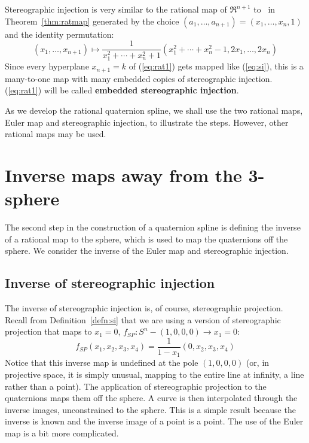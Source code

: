 \documentclass[11pt]{article}
\begin{document}
Stereographic injection is very similar to the rational map of $\Re^{n+1}$ to
\ in Theorem~\ref{thm:ratmap} generated by the choice 
$(a_1,\ldots,a_{n+1}) = (x_1,\ldots,x_{n},1)$ and the identity permutation:
%
\begin{equation}
\label{eq:rat1}
(x_1,\ldots,x_{n+1}) \mapsto 
	\frac{1}{x_1^2 + \cdots + x_{n}^2 + 1}
	(x_1^2 + \cdots + x_{n}^2 - 1,
	 2x_1, \ldots, 2x_{n})
\end{equation}
%
Since every hyperplane $x_{n+1}=k$ of (\ref{eq:rat1}) gets mapped like 
(\ref{eq:si}), this is a many-to-one map with many embedded copies of
stereographic injection.
(\ref{eq:rat1}) will be called {\bf embedded stereographic injection}.

As we develop the rational quaternion spline, we shall use the two rational maps,
Euler map and stereographic injection, to illustrate the steps.
However, other rational maps may be used.

\clearpage

\section{Inverse maps away from the 3-sphere}

The second step in the construction of a quaternion spline is defining
the inverse of a rational map to the sphere,
which is used to map the quaternions off the sphere.
We consider the inverse of the Euler map and stereographic injection.

\subsection{Inverse of stereographic injection}

The inverse of stereographic injection is, of course, stereographic projection.
Recall from Definition~\ref{defn:si} that we are using a version of stereographic 
projection that maps to $x_1=0$, $f_{SP}:S^n - (1,0,0,0) \rightarrow x_1=0$:
\begin{equation}
\label{eqn:projection}
f_{SP}(x_1,x_2,x_3,x_4) = \frac{1}{1-x_1}(0,x_2,x_3,x_4)  %
\end{equation}
Notice that this inverse map is undefined at the pole $(1,0,0,0)$
(or, in projective space, it is simply unusual, mapping to the entire line at infinity, 
a line rather than a point).
The application of stereographic projection to the quaternions maps them off 
the sphere.
A curve is then interpolated through the inverse images, unconstrained to the sphere.
This is a simple result because the inverse is known and the inverse image of a point
is a point.
The use of the Euler map is a bit more complicated.
\end{document}

